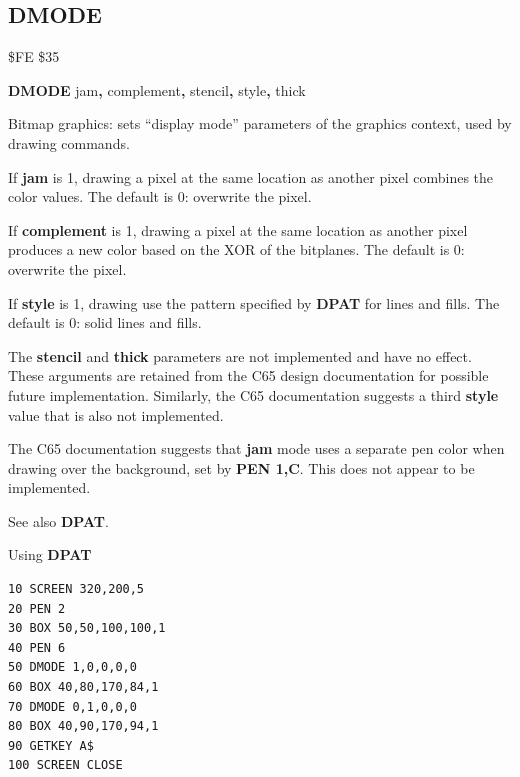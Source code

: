 
\newpage
\subsection{DMODE}
\begin{description}[leftmargin=2cm,style=nextline]
\item [Token:] \$FE \$35
\item [Format:] {\bf DMODE} jam{\bf,} complement{\bf,}
		stencil{\bf,} style{\bf,} thick
\item [Usage:]
   Bitmap graphics: sets ``display mode'' parameters of the graphics
   context, used by drawing commands.

   If {\bf jam} is 1, drawing a pixel at the same location as another pixel combines the color values. The default is 0: overwrite the pixel.

   If {\bf complement} is 1, drawing a pixel at the same location as another pixel produces a new color based on the XOR of the bitplanes. The default is 0: overwrite the pixel.

   If {\bf style} is 1, drawing use the pattern specified by {\bf DPAT} for lines and fills. The default is 0: solid lines and fills.

\item[Remarks:]
   The {\bf stencil} and {\bf thick} parameters are not implemented and have no effect. These arguments are retained from the C65 design documentation for possible future implementation. Similarly, the C65 documentation suggests a third {\bf style} value that is also not implemented.

   The C65 documentation suggests that {\bf jam} mode uses a separate pen color when drawing over the background, set by {\bf PEN 1,C}. This does not appear to be implemented.

   See also {\bf DPAT}.

\item [Example:] Using {\bf DPAT}
\begin{tcolorbox}[colback=black,coltext=white]
\verbatimfont{\codefont}
\begin{verbatim}
10 SCREEN 320,200,5
20 PEN 2
30 BOX 50,50,100,100,1
40 PEN 6
50 DMODE 1,0,0,0,0
60 BOX 40,80,170,84,1
70 DMODE 0,1,0,0,0
80 BOX 40,90,170,94,1
90 GETKEY A$
100 SCREEN CLOSE
\end{verbatim}
\end{tcolorbox}
\end{description}


